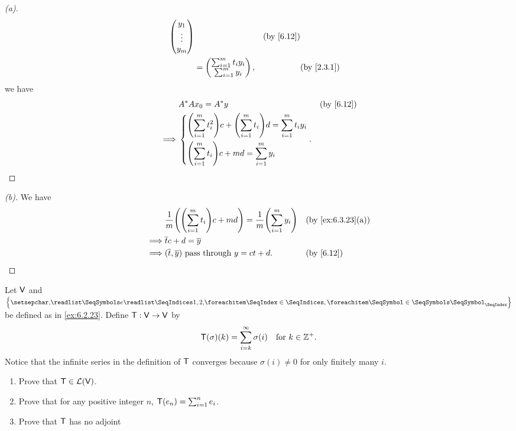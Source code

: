 \begin{proof}[(a)]
\begin{align*}
\begin{pmatrix}
			                            y_1    \\
			                            \vdots \\
			                            y_m
		                            \end{pmatrix}                                                    &  & \by{6.12} \\
		          & = \begin{pmatrix}
			              \sum_{i = 1}^m t_i y_i \\
			              \sum_{i = 1}^m y_i
		              \end{pmatrix},                                                        &  & \by{2.3.1}
	\end{align*}
	we have
	\begin{align*}
		         & A^* A x_0 = A^* y                                                                                         &  & \by{6.12} \\
		\implies & \begin{dcases}
			           \pa{\sum_{i = 1}^m t_i^2} c + \pa{\sum_{i = 1}^m t_i} d = \sum_{i = 1}^m t_i y_i \\
			           \pa{\sum_{i = 1}^m t_i} c + md = \sum_{i = 1}^m y_i
		           \end{dcases}.
	\end{align*}
\end{proof}

\begin{proof}[(b)]
	We have
	\begin{align*}
		         & \frac{1}{m} \pa{\pa{\sum_{i = 1}^m t_i} c + md} = \frac{1}{m} \pa{\sum_{i = 1}^m y_i} &  & \by{ex:6.3.23}[a] \\
		\implies & \overline{t} c + d = \overline{y}                                                                            \\
		\implies & (\overline{t}, \overline{y}) \text{ pass through } y = ct + d.                        &  & \by{6.12}
	\end{align*}
\end{proof}

\begin{ex}\label{ex:6.3.24}
	Let \(\mathsf{V}\) and \(\set{\seq{e}{1,2,}}\) be defined as in \cref{ex:6.2.23}.
	Define \(\mathsf{T} : \mathsf{V} \to \mathsf{V}\) by
	\[
		\mathsf{T}(\sigma)(k) = \sum_{i = k}^\infty \sigma(i) \quad \text{for } k \in \mathbb{Z}^+.
	\]
	Notice that the infinite series in the definition of \(\mathsf{T}\) converges because \(\sigma(i) \neq 0\) for only finitely many \(i\).
	\begin{enumerate}
		\item Prove that \(\mathsf{T} \in \mathcal{L}(\mathsf{V})\).
		\item Prove that for any positive integer \(n\), \(\mathsf{T}(e_n) = \sum_{i = 1}^n e_i\).
		\item Prove that \(\mathsf{T}\) has no adjoint
	\end{enumerate}
\end{ex}

